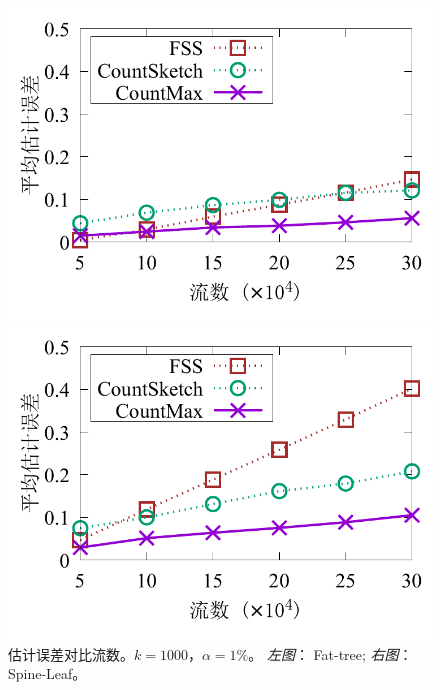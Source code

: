 \begin{figure}[ht]
	\centering
	\begin{minipage}[t]{0.49\linewidth}
		\centering
		\includegraphics[width=\linewidth]{fig/ft_flow_appr_1000_099.pdf}
	\end{minipage}\vspace{-0.6em}%
	\begin{minipage}[t]{0.49\linewidth}
		\centering
		\includegraphics[width=\linewidth]{fig/hy_flow_appr_1000_099.pdf}
	\end{minipage}\vspace{-0.6em}
	\caption{\textnormal{估计误差对比流数。$k=1000$，$\alpha = 1\%$。 \textit{左图}： Fat-tree; \textit{右图}： Spine-Leaf。}}
	\label{fig:acc,f,1000,1}
\end{figure}


